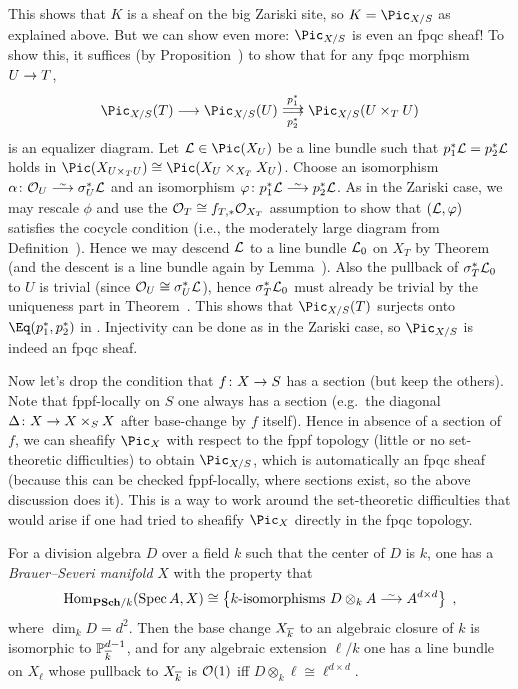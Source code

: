\documentclass[a4paper,parskip=half,numbers=enddot, DIV=12]{scrreprt}
\begin{document}
\begin{example}
	This shows that $K$ is a sheaf on the big Zariski site, so $K=\Pic_{X/S}$ as explained above. But we can show even more: $\Pic_{X/S}$ is even an fpqc sheaf! To show this, it suffices (by Proposition~) to show that for any fpqc morphism $U\morphism T$,
	\begin{align}\lbl{eq:PicfpqcSheaf}
		\Pic_{X/S}(T)\morphism \Pic_{X/S}(U)\doublemorphism[ p_1^*][ p_2^*]\Pic_{X/S}(U\times_TU)
	\end{align}
	is an equalizer diagram. Let $\Ll\in\Pic(X_U)$ be a line bundle such that $ p_1^*\mathcal{L}= p_2^*\mathcal{L}$ holds in $\Pic(X_{U\times_TU})\cong\Pic(X_U\times_{X_T}X_U)$. Choose an isomorphism $\alpha\colon \Oo_U\isomorphism \sigma_U^*\Ll$ and an isomorphism $\phi\colon  p_1^*\Ll\isomorphism  p_2^*\Ll$. As in the Zariski case, we may rescale $\phi$ and use the $\mathcal{O}_T\cong f_{T,*}\mathcal{O}_{X_T}$ assumption to show that $(\mathcal{L},\varphi)$ satisfies the cocycle condition (i.e., the moderately large diagram from Definition~). Hence we may descend $\mathcal{L}$ to a line bundle $\mathcal{L}_0$ on $X_T$ by Theorem~ (and the descent is a line bundle again by Lemma~). Also the pullback of $\sigma_T^*\mathcal{L}_0$ to $U$ is trivial (since $\mathcal{O}_U\cong \sigma_U^*\mathcal{L}$), hence $\sigma_T^*\mathcal{L}_0$ must already be trivial by the uniqueness part in Theorem~. This shows that $\Pic_{X/S}(T)$ surjects onto $\Eq( p_1^*, p_2^*)$ in . Injectivity can be done as in the Zariski case, so $\Pic_{X/S}$ is indeed an fpqc sheaf.
	
	Now let's drop the condition that $f\colon X\morphism S$ has a section (but keep the others). Note that fppf-locally on $S$ one always has a section (e.g.\ the diagonal $\Delta\colon X\morphism X\times_SX$ after base-change by $f$ itself). Hence in absence of a section of $f$, we can sheafify $\Pic_X$ with respect to the fppf topology (little or no set-theoretic difficulties) to obtain $\Pic_{X/S}$, which is automatically an fpqc sheaf (because this can be checked fppf-locally, where sections exist, so the above discussion does it). This is a way to work around the set-theoretic difficulties that would arise if one had tried to sheafify $\Pic_X$ directly in the fpqc topology.
\end{example}
\begin{example}
	For a division algebra $D$ over a field $k$ such that the center of $D$ is $k$, one has a \emph{Brauer--Severi manifold} $X$ with the property that
	\begin{align*}
		\Hom_{\cat{PSch}/k}(\Spec A,X)\cong \left\{k\text{-isomorphisms }D\otimes_kA\isomorphism A^{d\times d}\right\}\;,
	\end{align*}
	where $\dim_kD=d^2$. Then the base change $X_{\overline{k}}$ to an algebraic closure of $k$ is isomorphic to $\mathbb{P}_{\overline{k}}^{d-1}$, and for any algebraic extension $\ell/k$ one has a line bundle on $X_\ell$ whose pullback to $X_{\overline{k}}$ is $\mathcal{O}(1)$ iff $D\otimes_k\ell\cong\ell^{d\times d}$.
\end{example}
\end{document}

